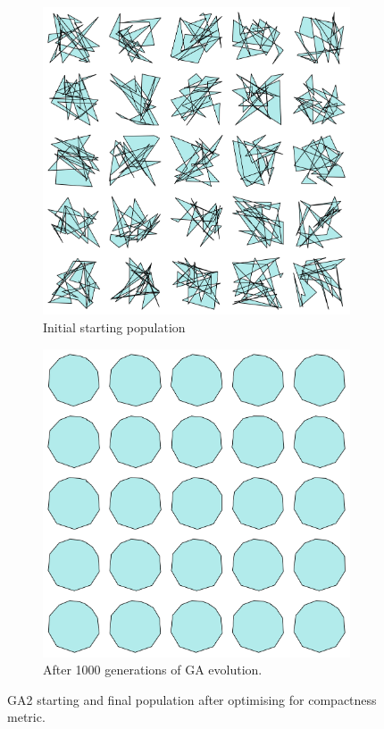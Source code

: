 \documentclass{article}
\begin{document}
\begin{figure}[H]
    \centering
    \begin{subfigure}[b]{0.45\textwidth}
        \centering
        \includegraphics[width=\textwidth]{figures/GAResults/GA3/30point_initial_pop.png}
        \caption{Initial starting population}
        \label{fig:GA3_starting}
    \end{subfigure}
    \hfill
    \begin{subfigure}[b]{0.45\textwidth}
        \centering
        \includegraphics[width=\textwidth]{figures/GAResults/GA3/final_population.png}
        \caption{After 1000 generations of GA evolution.}
        \label{fig:GA3_final}
    \end{subfigure}
    \caption{GA2 starting and final population after optimising for compactness metric.}
    \label{fig:GA3_before_after_GA}
\end{figure}
\end{document}
